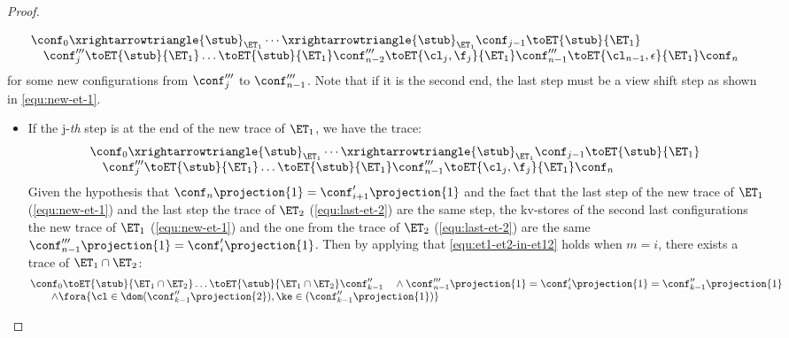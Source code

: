 \begin{proof}
\begin{itemize}
\begin{itemize}
\[\begin{array}{@{}l}
        \conf_0 \xrightarrowtriangle{\stub}_{\ET_{1}} \cdots \xrightarrowtriangle{\stub}_{\ET_{1}} \conf_{j-1} \toET{\stub}{\ET_{1}} \\ 
        \quad \conf'''_{j} \toET{\stub}{\ET_{1}} \dots \toET{\stub}{\ET_{1}} \conf'''_{n-2} \toET{\cl_j, \f_j }{\ET_{1}} \conf'''_{n-1} \toET{\cl_{n-1}, \epsilon }{\ET_{1}} \conf_{n}  \\ 
    \end{array}
\]
for some new configurations from \( \conf'''_{j}\) to \( \conf'''_{n-1} \).
Note that if it is the second end, the last step must be a view shift step as shown in \cref{equ:new-et-1}.
\begin{itemize}
    \item If the j-\emph{th} step is at the end of the new trace of \( \ET_1 \), we have the trace:
\begin{equation}
    \label{equ:new-et-1}
    \begin{array}{@{}l}
        \conf_0 \xrightarrowtriangle{\stub}_{\ET_{1}} \cdots \xrightarrowtriangle{\stub}_{\ET_{1}} \conf_{j-1} \toET{\stub}{\ET_{1}} \\ 
        \quad \conf'''_{j} \toET{\stub}{\ET_{1}} \dots \toET{\stub}{\ET_{1}} \conf'''_{n-1} \toET{\cl_j, \f_j }{\ET_{1}} \conf_{n}  \\
    \end{array}
\end{equation}
Given the hypothesis that \( \conf_{n}\projection{1} = \conf'_{i+1}\projection{1} \) and the fact that the last step of the new trace of \( \ET_1 \) (\cref{equ:new-et-1}) and the last step the trace of \( \ET_2 \) (\cref{equ:last-et-2}) are the same step, the kv-stores of the second last configurations the new trace of \( \ET_1 \) (\cref{equ:new-et-1}) and the one from the trace of \( \ET_2 \) (\cref{equ:last-et-2}) are the same \(  \conf'''_{n-1}\projection{1} = \conf'_{i}\projection{1} \).
Then by applying \ih that \cref{equ:et1-et2-in-et12} holds when \( m = i \), there exists a trace of \( \ET_1 \cap \ET_2 \):
\begin{equation}
    \label{equ:ih-for-merge-two-trace}
    \begin{array}{@{}l}
        \conf_0 \toET{\stub}{\ET_1 \cap \ET_2} \dots \toET{\stub}{\ET_1 \cap \ET_2} \conf''_{k-1} 
        \quad {} \land \conf'''_{n-1}\projection{1} = \conf'_{i}\projection{1} = \conf''_{k-1}\projection{1}  \\
        \qquad \land \fora{\cl \in \dom(\conf''_{k-1}\projection{2}),\ke \in (\conf''_{k-1}\projection{1})} \\

\end{array}
\end{equation}
\end{itemize}
\end{itemize}
\end{itemize}
\end{proof}
